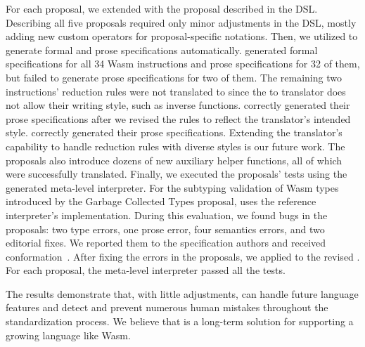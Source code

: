 For each proposal, we extended \specdsl with the proposal described in the DSL.
Describing all five proposals required only minor adjustments in the DSL,
mostly adding new custom operators for proposal-specific notations.
Then, we utilized \dslname to generate formal and prose specifications automatically.
\dslname generated formal specifications for all 34 Wasm instructions and
prose specifications for 32 of them,
but failed to generate prose specifications for two of them. 
The remaining two instructions' reduction rules were not translated to \al
since the \dl to \al translator does not allow their writing style, such as inverse functions. 
\dslname correctly generated their prose specifications
after we revised the rules to reflect the translator's intended style.
\dslname correctly generated their prose specifications.
Extending the translator's capability to handle reduction rules with diverse styles is our future work.
The proposals also introduce dozens of new auxiliary helper
functions, all of which were successfully translated.
Finally, we executed the proposals' tests using the generated meta-level interpreter.
For the subtyping validation of Wasm types introduced by the Garbage Collected Types proposal,
\dslname uses the reference interpreter's implementation.
During this evaluation, we found  bugs in the proposals:
two type errors, one prose error, four semantics errors, and two editorial fixes.
We reported them to the specification authors and received conformation~\cite{proposalbugs}.
After fixing the errors in the proposals, we applied \dslname to the revised \specdsl.
For each proposal, the meta-level interpreter passed all the tests.

The results demonstrate that, with little adjustments,
\dslname can handle future language features and detect and prevent
numerous human mistakes throughout the standardization process.
We believe that \dslname is a long-term solution for supporting a growing
language like Wasm.
